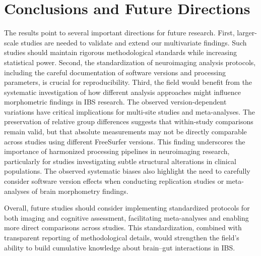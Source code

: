 \documentclass[diagnostics,article,accept,pdftex,moreauthors]{Definitions/mdpi}
\begin{document}
\section{Conclusions and Future Directions}

The results point to several important directions for future research. First, larger-scale studies are needed to validate and extend our multivariate findings. Such studies should maintain rigorous methodological standards while increasing statistical power. Second, the standardization of neuroimaging analysis protocols, including the careful documentation of software versions and processing parameters, is crucial for reproducibility. Third, the field would benefit from the systematic investigation of how different analysis approaches might influence morphometric findings in IBS research. The observed version-dependent variations have critical implications for multi-site studies and meta-analyses. The preservation of relative group differences suggests that within-study comparisons remain valid, but that absolute measurements may not be directly comparable across studies using different FreeSurfer versions. This finding underscores the importance of harmonized processing pipelines in neuroimaging research, particularly for studies investigating subtle structural alterations in clinical populations. The observed systematic biases also highlight the need to carefully consider software version effects when conducting replication studies or meta-analyses of brain morphometry findings.

Overall, future studies should consider implementing standardized protocols for both imaging and cognitive assessment, facilitating meta-analyses and enabling more direct comparisons across studies. This standardization, combined with transparent reporting of methodological details, would strengthen the field's ability to build cumulative knowledge about brain--gut interactions in IBS.
\end{document}

